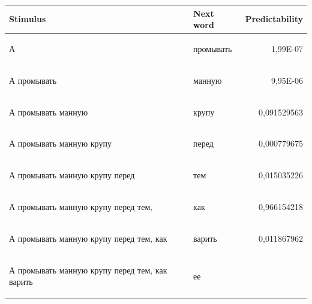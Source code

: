 \documentclass[a4paper]{article}
\begin{document}
\begin{table}
\centering
\begin{tabular}{llr}

\textbf{Stimulus} & \textbf{Next word} & \textbf{Predictability} \\
\hline
\begin{russian} А \end{russian} &
\begin{russian} промывать \end{russian} &
1,99E-07 \\
\begin{russian} А промывать \end{russian} &
\begin{russian} манную \end{russian} &
9,95E-06 \\
\begin{russian} А промывать манную \end{russian} &
\begin{russian} крупу \end{russian} &
0,091529563 \\
\begin{russian} А промывать манную крупу \end{russian} &
\begin{russian} перед \end{russian} &
0,000779675 \\
\begin{russian} А промывать манную крупу перед \end{russian} &
\begin{russian} тем \end{russian} &
0,015035226 \\
\begin{russian} А промывать манную крупу перед тем‚ \end{russian} &
\begin{russian} как \end{russian} &
0,966154218 \\
\begin{russian} А промывать манную крупу перед тем‚ как \end{russian} &
\begin{russian} варить \end{russian} &
0,011867962 \\
\begin{russian} А промывать манную крупу перед тем‚ как варить \end{russian} &
\begin{russian} ее \end{russian} &

\end{tabular}
\end{table}
\end{document}
